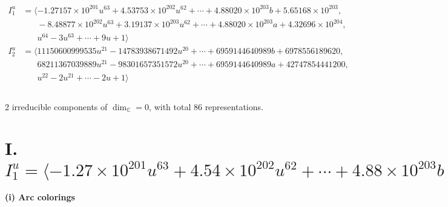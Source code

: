 \documentclass[1p]{elsarticle_modified}
\theoremstyle{definition}
\begin{document}
\begin{align*}
I^u_{1}&=\langle 
-1.27157\times10^{201} u^{63}+4.53753\times10^{202} u^{62}+\cdots+4.88020\times10^{203} b+5.65168\times10^{203},\\
\phantom{I^u_{1}}&\phantom{= \langle  }-8.48877\times10^{202} u^{63}+3.19137\times10^{203} u^{62}+\cdots+4.88020\times10^{203} a+4.32696\times10^{204},\\
\phantom{I^u_{1}}&\phantom{= \langle  }u^{64}-3 u^{63}+\cdots+9 u+1\rangle \\
I^u_{2}&=\langle 
11150600999535 u^{21}-14783938671492 u^{20}+\cdots+6959144640989 b+6978556189620,\\
\phantom{I^u_{2}}&\phantom{= \langle  }68211367039889 u^{21}-98301657351572 u^{20}+\cdots+6959144640989 a+42747854441200,\\
\phantom{I^u_{2}}&\phantom{= \langle  }u^{22}-2 u^{21}+\cdots-2 u+1\rangle \\
\\
\end{align*}
\raggedright * 2 irreducible components of $\dim_{\mathbb{C}}=0$, with total 86 representations.\\
\newpage
\renewcommand{\arraystretch}{1}
\centering \section*{I. $I^u_{1}= \langle -1.27\times10^{201} u^{63}+4.54\times10^{202} u^{62}+\cdots+4.88\times10^{203} b+5.65\times10^{203},\;-8.49\times10^{202} u^{63}+3.19\times10^{203} u^{62}+\cdots+4.88\times10^{203} a+4.33\times10^{204},\;u^{64}-3 u^{63}+\cdots+9 u+1 \rangle$}
\flushleft \textbf{(i) Arc colorings}\\
\end{document}
